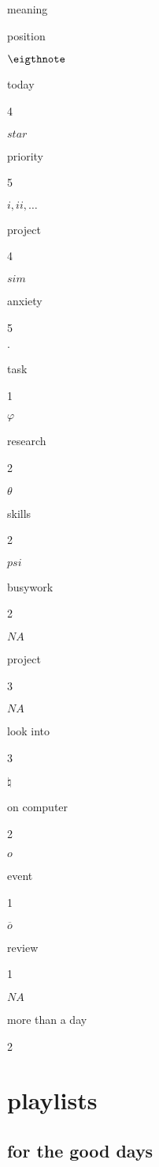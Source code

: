 \documentclass[]{book}
\begin{document}
meaning

position

\(\eigthnote\)

today

4

\(star\)

priority

5

\(i, ii, \dots\)

project

4

\(sim\)

anxiety

5

\(\cdot\)

task

1

\(\varphi\)

research

2

\(\theta\)

skills

2

\(psi\)

busywork

2

\(NA\)

project

3

\(NA\)

look into

3

\(\natural\)

on computer

2

\(o\)

event

1

\(\overline o\)

review

1

\(NA\)

more than a day

2

\hypertarget{playlists}{%
\section{playlists}\label{playlists}}

\hypertarget{for-the-good-days}{%
\subsection{for the good days}\label{for-the-good-days}}
\end{document}

